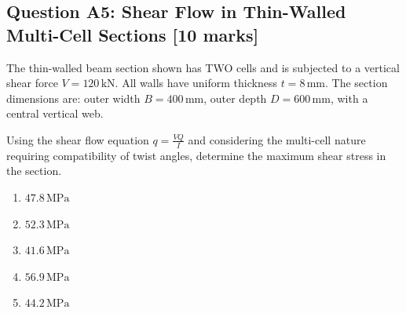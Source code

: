 \documentclass[12pt,a4paper]{article}
\begin{document}
\begin{questionbox}
\subsection*{Question A5: Shear Flow in Thin-Walled Multi-Cell Sections [10 marks]}

The thin-walled beam section shown has TWO cells and is subjected to a vertical shear force 
$V = 120\,\text{kN}$. All walls have uniform thickness $t = 8\,\text{mm}$. The section dimensions are:
outer width $B = 400\,\text{mm}$, outer depth $D = 600\,\text{mm}$, with a central vertical web.

\begin{center}
\end{center}

Using the shear flow equation $q = \frac{VQ}{I}$ and considering the multi-cell nature requiring 
compatibility of twist angles, determine the maximum shear stress in the section.

\begin{mcqbox}
\begin{enumerate}[label=(\Alph*),leftmargin=*]
    \item $47.8\,\text{MPa}$
    \item $52.3\,\text{MPa}$
    \item $41.6\,\text{MPa}$
    \item $56.9\,\text{MPa}$
    \item $44.2\,\text{MPa}$
\end{enumerate}
\end{mcqbox}
\end{questionbox}
\end{document}
